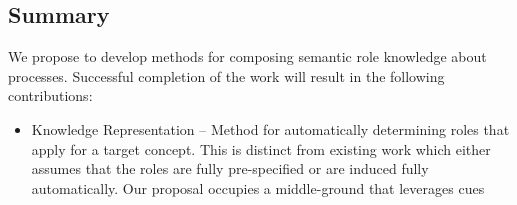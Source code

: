 

\subsection{Summary}

We propose to develop methods for composing semantic role knowledge about processes. Successful completion of the work will result in the following contributions:
\begin{itemize}
\item Knowledge Representation -- Method for automatically determining roles that apply for a target concept. This is distinct from existing work which either assumes that the roles are fully pre-specified or are induced fully automatically. Our proposal occupies a middle-ground that leverages cues 
\end{itemize}
%